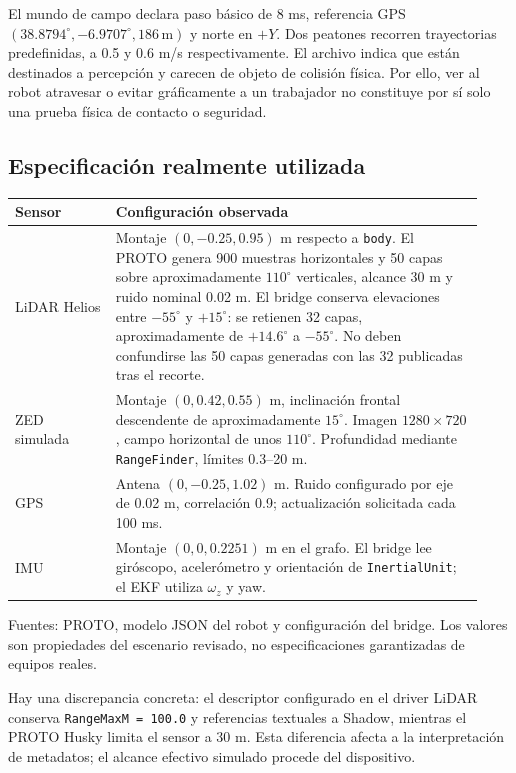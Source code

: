 \documentclass[11pt,a4paper]{article}
\newcommand{\code}[1]{\nolinkurl{#1}}
\begin{document}
El mundo de campo declara paso básico de 8 ms, referencia GPS
$(38.8794^\circ,-6.9707^\circ,186\,\mathrm{m})$ y norte en $+Y$. Dos peatones
recorren trayectorias predefinidas, a 0.5 y 0.6 m/s respectivamente. El archivo indica
que están destinados a percepción y carecen de objeto de colisión física. Por ello,
ver al robot atravesar o evitar gráficamente a un trabajador no constituye por sí
solo una prueba física de contacto o seguridad.~\cite{worlds}

\subsection{Especificación realmente utilizada}
\begin{longtable}{p{0.20\linewidth}p{0.73\linewidth}}
\toprule Sensor & Configuración observada \\
\midrule\endhead
LiDAR Helios & Montaje $(0,-0.25,0.95)$ m respecto a \code{body}. El PROTO genera 900 muestras horizontales y 50 capas sobre aproximadamente $110^\circ$ verticales, alcance 30 m y ruido nominal 0.02 m. El bridge conserva elevaciones entre $-55^\circ$ y $+15^\circ$: se retienen 32 capas, aproximadamente de $+14.6^\circ$ a $-55^\circ$. No deben confundirse las 50 capas generadas con las 32 publicadas tras el recorte. \\
ZED simulada & Montaje $(0,0.42,0.55)$ m, inclinación frontal descendente de aproximadamente $15^\circ$. Imagen $1280\times720$, campo horizontal de unos $110^\circ$. Profundidad mediante \code{RangeFinder}, límites 0.3--20 m. \\
GPS & Antena $(0,-0.25,1.02)$ m. Ruido configurado por eje de 0.02 m, correlación 0.9; actualización solicitada cada 100 ms. \\
IMU & Montaje $(0,0,0.2251)$ m en el grafo. El bridge lee giróscopo, acelerómetro y orientación de \code{InertialUnit}; el EKF utiliza $\omega_z$ y yaw. \\
\bottomrule
\end{longtable}
Fuentes: PROTO, modelo JSON del robot y configuración del bridge. Los valores son
propiedades del escenario revisado, no especificaciones garantizadas de equipos
reales.~\cite{proto,mounts,bridgeconfig}

Hay una discrepancia concreta: el descriptor configurado en el driver LiDAR conserva
\code{RangeMaxM = 100.0} y referencias textuales a Shadow, mientras el PROTO Husky
limita el sensor a 30 m. Esta diferencia afecta a la interpretación de metadatos;
el alcance efectivo simulado procede del dispositivo.~\cite{lidarconfig,proto}
\end{document}
